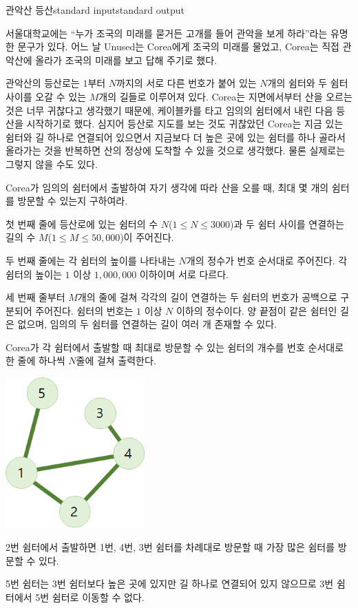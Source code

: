 \begin{problem}{관악산 등산}{standard input}{standard output}

서울대학교에는 ``누가 조국의 미래를 묻거든 고개를 들어 관악을 보게 하라''라는 유명한 문구가 있다. 어느 날 Unused는 Corea에게 조국의 미래를 물었고, Corea는 직접 관악산에 올라가 조국의 미래를 보고 답해 주기로 했다.

관악산의 등산로는 $1$부터 $N$까지의 서로 다른 번호가 붙어 있는 $N$개의 쉼터와 두 쉼터 사이를 오갈 수 있는 $M$개의 길들로 이루어져 있다. Corea는 지면에서부터 산을 오르는 것은 너무 귀찮다고 생각했기 때문에, 케이블카를 타고 임의의 쉼터에서 내린 다음 등산을 시작하기로 했다. 심지어 등산로 지도를 보는 것도 귀찮았던 Corea는 지금 있는 쉼터와 길 하나로 연결되어 있으면서 지금보다 더 높은 곳에 있는 쉼터를 하나 골라서 올라가는 것을 반복하면 산의 정상에 도착할 수 있을 것으로 생각했다. 물론 실제로는 그렇지 않을 수도 있다.

Corea가 임의의 쉼터에서 출발하여 자기 생각에 따라 산을 오를 때, 최대 몇 개의 쉼터를 방문할 수 있는지 구하여라.

\InputFile
첫 번째 줄에 등산로에 있는 쉼터의 수 $N$($1 \le N \le 3000$)과 두 쉼터 사이를 연결하는 길의 수 $M$($1 \le M \le 50,000$)이 주어진다.

두 번째 줄에는 각 쉼터의 높이를 나타내는 $N$개의 정수가 번호 순서대로 주어진다. 각 쉼터의 높이는 $1$ 이상 $1,000,000$ 이하이며 서로 다르다.

세 번째 줄부터 $M$개의 줄에 걸쳐 각각의 길이 연결하는 두 쉼터의 번호가 공백으로 구분되어 주어진다. 쉼터의 번호는 $1$ 이상 $N$ 이하의 정수이다. 양 끝점이 같은 쉼터인 길은 없으며, 임의의 두 쉼터를 연결하는 길이 여러 개 존재할 수 있다.

\OutputFile
Corea가 각 쉼터에서 출발할 때 최대로 방문할 수 있는 쉼터의 개수를 번호 순서대로 한 줄에 하나씩 $N$줄에 걸쳐 출력한다.

\Example

\begin{example}
%
\end{example}

\Notes
\begin{center}
  \includegraphics[width=0.4\textwidth]{climb.png}
\end{center}

2번 쉼터에서 출발하면 1번, 4번, 3번 쉼터를 차례대로 방문할 때 가장 많은 쉼터를 방문할 수 있다.

5번 쉼터는 3번 쉼터보다 높은 곳에 있지만 길 하나로 연결되어 있지 않으므로 3번 쉼터에서 5번 쉼터로 이동할 수 없다.

\end{problem}
